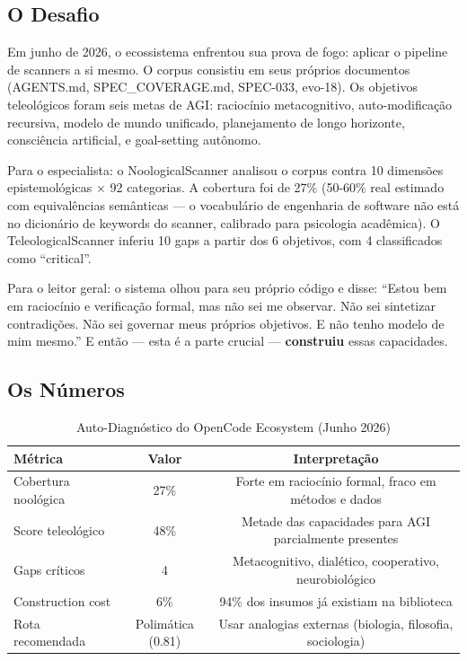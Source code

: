 \subsection{O Desafio}

Em junho de 2026, o ecossistema enfrentou sua prova de fogo: aplicar o pipeline de scanners a si mesmo. O corpus consistiu em seus próprios documentos (AGENTS.md, SPEC\_COVERAGE.md, SPEC-033, evo-18). Os objetivos teleológicos foram seis metas de AGI: raciocínio metacognitivo, auto-modificação recursiva, modelo de mundo unificado, planejamento de longo horizonte, consciência artificial, e goal-setting autônomo.

Para o especialista: o NoologicalScanner analisou o corpus contra 10 dimensões epistemológicas $\times$ 92 categorias. A cobertura foi de 27\% (50-60\% real estimado com equivalências semânticas — o vocabulário de engenharia de software não está no dicionário de keywords do scanner, calibrado para psicologia acadêmica). O TeleologicalScanner inferiu 10 gaps a partir dos 6 objetivos, com 4 classificados como ``critical''.

Para o leitor geral: o sistema olhou para seu próprio código e disse: ``Estou bem em raciocínio e verificação formal, mas não sei me observar. Não sei sintetizar contradições. Não sei governar meus próprios objetivos. E não tenho modelo de mim mesmo.'' E então — esta é a parte crucial — \textbf{construiu} essas capacidades.

\subsection{Os Números}

\begin{table}[H]
\centering
\small
\caption{Auto-Diagnóstico do OpenCode Ecosystem (Junho 2026)}
\label{tab:auto_diagnosis}
\begin{tabular}{lcc}
\toprule
\textbf{Métrica} & \textbf{Valor} & \textbf{Interpretação} \\
\midrule
Cobertura noológica & 27\% & Forte em raciocínio formal, fraco em métodos e dados \\
Score teleológico & 48\% & Metade das capacidades para AGI parcialmente presentes \\
Gaps críticos & 4 & Metacognitivo, dialético, cooperativo, neurobiológico \\
Construction cost & 6\% & 94\% dos insumos já existiam na biblioteca \\
Rota recomendada & Polimática (0.81) & Usar analogias externas (biologia, filosofia, sociologia) \\
\bottomrule
\end{tabular}
\end{table}

